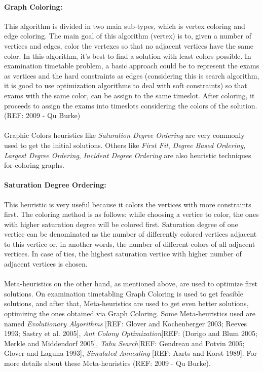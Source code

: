 \paragraph{Graph Coloring:}
This algorithm is divided in two main sub-types, which is vertex coloring and edge coloring. The main goal of this algorithm (vertex) is to, given a number of vertices and edges, color the vertexes so that no adjacent vertices have the same color. In this algorithm, it's best to find a solution with least colors possible. In examination timetable problem, a basic approach could be to represent the exams as vertices and the hard constraints as edges (considering this is search algorithm, it is good to use optimization algorithms to deal with soft constraints) so that exams with the same color, can be assign to the same timeslot. After coloring, it proceeds to assign the exams into timeslots considering the colors of the solution. (REF: 2009 - Qu Burke)\\
\\
Graphic Colors heuristics like \textit{Saturation Degree Ordering} are very commonly used to get the initial solutions. Others like \textit{First Fit}, \textit{Degree Based Ordering}, \textit{Largest Degree Ordering}, \textit{Incident Degree Ordering} are also heuristic techniques for coloring graphs.
\\
\paragraph{Saturation Degree Ordering:}
This heuristic is very useful because it colors the vertices with more constraints first. The coloring method is as follows: while choosing a vertice to color, the ones with higher saturation degree will be colored first. Saturation degree of one vertice can be denominated as the number of differently colored vertices adjacent to this vertice or, in another words, the number of different colors of all adjacent vertices. In case of ties, the highest saturation vertice with higher number of adjacent vertices is chosen.\\
\\
Meta-heuristics on the other hand, as mentioned above, are used to optimize first solutions. On examination timetabling Graph Coloring is used to get feasible solutions, and after that, Meta-heuristics are used to get even better solutions, optimizing the ones obtained via Graph Coloring. Some Meta-heuristics used are named \textit{Evolutionary Algorithms} [REF: Glover and Kochenberger 2003; Reeves 1993; Sastry et al. 2005], \textit{Ant Colony Optimization}[REF: (Dorigo and Blum 2005; Merkle and Middendorf 2005], \textit{Tabu Search}[REF: Gendreau and Potvin 2005; Glover and Laguna 1993], \textit{Simulated Annealing} [REF: Aarts and Korst 1989]. For more details about these Meta-heuristics (REF: 2009 - Qu Burke).\\
\\

